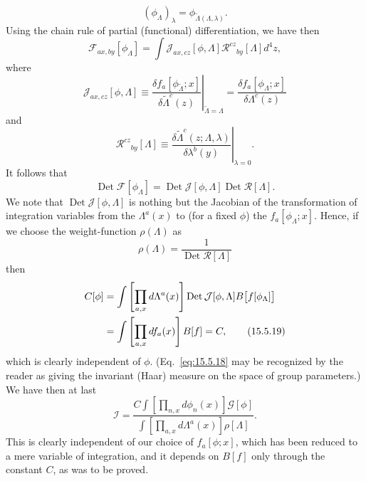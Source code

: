 \begin{equation}
  (\phi_\Lambda)_\lambda=\phi_{\widetilde\Lambda(\Lambda,\lambda)}.
  \tag{15.5.13}\label{eq:15.5.13}
\end{equation}
Using the chain rule of partial (functional) differentiation, we have then
\begin{equation}
  \mathcal F_{a x,b y}[\phi_\Lambda]
  =\int\mathcal J_{a x,c z}[\phi,\Lambda]
  \mathcal R^{c z}{}_{b y}[\Lambda]d^4z,
  \tag{15.5.14}\label{eq:15.5.14}
\end{equation}
where
\begin{equation}
  \mathcal J_{a x,c z}[\phi,\Lambda]
  \equiv\left.\frac{\delta f_a[\phi_{\widetilde\Lambda};x]}
  {\delta\widetilde\Lambda^c(z)}\right|_{\widetilde\Lambda=\Lambda}
  =\frac{\delta f_a[\phi_\Lambda;x]}{\delta\Lambda^c(z)}
  \tag{15.5.15}\label{eq:15.5.15}
\end{equation}
and
\begin{equation}
  \mathcal R^{c z}{}_{b y}[\Lambda]
  \equiv\left.\frac{\delta\widetilde\Lambda^c(z;\Lambda,\lambda)}
  {\delta\lambda^b(y)}\right|_{\lambda=0}.
  \tag{15.5.16}\label{eq:15.5.16}
\end{equation}
It follows that
\begin{equation}
  \operatorname{Det}\mathcal F[\phi_\Lambda]
  =\operatorname{Det}\mathcal J[\phi,\Lambda]
  \operatorname{Det}\mathcal R[\Lambda].
  \tag{15.5.17}\label{eq:15.5.17}
\end{equation}
We note that $\operatorname{Det}\mathcal J[\phi,\Lambda]$ is nothing but the
Jacobian of the transformation of integration variables from the
$\Lambda^a(x)$ to (for a fixed $\phi$) the $f_a[\phi_\Lambda;x]$.
Hence, if we choose the weight-function $\rho(\Lambda)$ as
\begin{equation}
  \rho(\Lambda)=\frac{1}{\operatorname{Det}\mathcal R[\Lambda]}
  \tag{15.5.18}\label{eq:15.5.18}
\end{equation}
then
\begin{align}
  C[\phi]
  &=\int\left[\prod_{a,x}d\Lambda^a(x)\right]
  \operatorname{Det}\mathcal J[\phi,\Lambda]
  B\bigl[f[\phi_\Lambda]\bigr]
  \notag\\
  &=\int\left[\prod_{a,x}df_a(x)\right]B[f]=C,
  \tag{15.5.19}\label{eq:15.5.19}
\end{align}
which is clearly independent of $\phi$. (Eq.~\eqref{eq:15.5.18} may be
recognized by the reader as giving the invariant (Haar) measure on the space
of group parameters.) We have then at last
\begin{equation}
  \mathcal I=
  \frac{C\displaystyle\int\left[\prod_{n,x}d\phi_n(x)\right]
  \mathcal G[\phi]}
  {\displaystyle\int\left[\prod_{a,x}d\Lambda^a(x)\right]
  \rho[\Lambda]}.
  \tag{15.5.20}\label{eq:15.5.20}
\end{equation}
This is clearly independent of our choice of $f_a[\phi;x]$, which has
been reduced to a mere variable of integration, and it depends on $B[f]$ only
through the constant $C$, as was to be proved.

